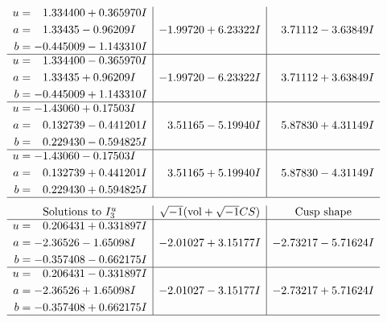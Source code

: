 \documentclass[1p]{elsarticle_modified}
\theoremstyle{definition}
\newcommand{\I}{\sqrt{-1}}
\begin{document}
$$\begin{array}{c|c|c}
\begin{aligned}
u &= \phantom{-}1.334400 + 0.365970 I \\
a &= \phantom{-}1.33435 - 0.96209 I \\
b &= -0.445009 - 1.143310 I\end{aligned}
 & -1.99720 + 6.23322 I & \phantom{-}3.71112 - 3.63849 I \\ \hline\begin{aligned}
u &= \phantom{-}1.334400 - 0.365970 I \\
a &= \phantom{-}1.33435 + 0.96209 I \\
b &= -0.445009 + 1.143310 I\end{aligned}
 & -1.99720 - 6.23322 I & \phantom{-}3.71112 + 3.63849 I \\ \hline\begin{aligned}
u &= -1.43060 + 0.17503 I \\
a &= \phantom{-}0.132739 - 0.441201 I \\
b &= \phantom{-}0.229430 - 0.594825 I\end{aligned}
 & \phantom{-}3.51165 - 5.19940 I & \phantom{-}5.87830 + 4.31149 I \\ \hline\begin{aligned}
u &= -1.43060 - 0.17503 I \\
a &= \phantom{-}0.132739 + 0.441201 I \\
b &= \phantom{-}0.229430 + 0.594825 I\end{aligned}
 & \phantom{-}3.51165 + 5.19940 I & \phantom{-}5.87830 - 4.31149 I\\
 \hline 
 \end{array}$$\newpage$$\begin{array}{c|c|c}  
\text{Solutions to }I^u_{3}& \I (\text{vol} + \sqrt{-1}CS) & \text{Cusp shape}\\
 \hline 
\begin{aligned}
u &= \phantom{-}0.206431 + 0.331897 I \\
a &= -2.36526 - 1.65098 I \\
b &= -0.357408 - 0.662175 I\end{aligned}
 & -2.01027 + 3.15177 I & -2.73217 - 5.71624 I \\ \hline\begin{aligned}
u &= \phantom{-}0.206431 - 0.331897 I \\
a &= -2.36526 + 1.65098 I \\
b &= -0.357408 + 0.662175 I\end{aligned}
 & -2.01027 - 3.15177 I & -2.73217 + 5.71624 I\\
 \hline 
 \end{array}$$\newpage
\end{document}
